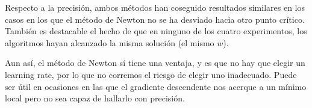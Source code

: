 \documentclass[a4]{article}
\begin{document}
Respecto a la precisión, ambos métodos han coseguido resultados
similares en los casos en los que el método de Newton no se ha
desviado hacia otro punto crítico. También es destacable
el hecho de que en ninguno de los cuatro experimentos, los
algoritmos hayan alcanzado la misma solución (el mismo $w$).

Aun así, el método de Newton sí tiene una ventaja, y es que no
hay que elegir un learning rate, por lo que no corremos
el riesgo de elegir uno inadecuado. Puede ser útil en
ocasiones en las que el gradiente descendente nos acerque a
un mínimo local pero no sea capaz de hallarlo con precisión.
\end{document}

